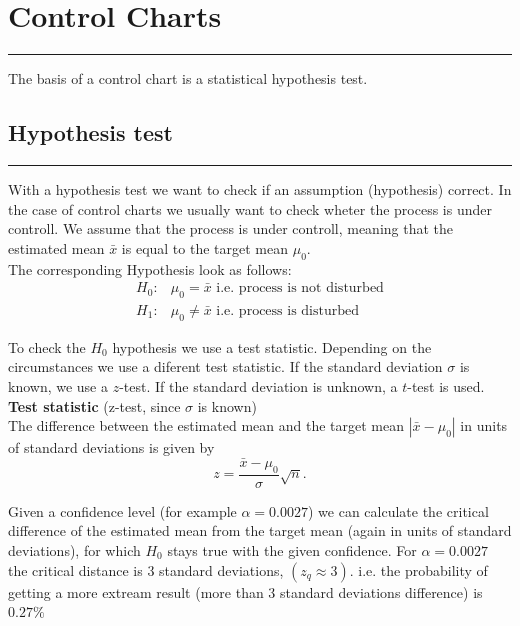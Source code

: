 \section{Control Charts}
\noindent\rule[\linienAbstand]{\linewidth}{\linienDickeDick}
The basis of a control chart is a statistical hypothesis test.

\subsection{Hypothesis test}
\noindent\rule[\linienAbstand]{\linewidth}{\linienDicke}
With a hypothesis test we want to check if an assumption (hypothesis) correct. In the case of control charts we usually want to check wheter the process is under controll. We assume that the process is under controll, meaning that the estimated mean $\bar{x}$ is equal to the target mean $\mu_0$.\\
The corresponding Hypothesis look as follows:
\begin{equation}
  \begin{split}
    H_0:& \mu_0 = \bar{x} \text{ i.e. process is not disturbed}\\
    H_1:& \mu_0 \neq \bar{x} \text{ i.e. process is disturbed}
  \end{split}
\end{equation}

To check the $H_0$ hypothesis we use a test statistic. Depending on the circumstances we use a diferent test statistic. If the standard deviation $\sigma$ is known, we use a $z$-test. If the standard deviation is unknown, a $t$-test is used.\\
\textbf{Test statistic} (z-test, since $\sigma$ is known)\\
The difference between the estimated mean and the target mean $|\bar{x} - \mu_0|$ in units of standard deviations is given by
\begin{equation}
  z = \frac{\bar{x}-\mu_0}{\sigma}\sqrt{n}.
\end{equation}

Given a confidence level (for example $\alpha = 0.0027$) we can calculate the critical difference of the estimated mean from the target mean (again in units of standard deviations), for which $H_0$ stays true with the given confidence. For $\alpha = 0.0027$ the critical distance is 3 standard deviations, $(z_q \approx 3)$. i.e. the probability of getting a more extream result (more than 3 standard deviations difference) is $0.27\%$\\

